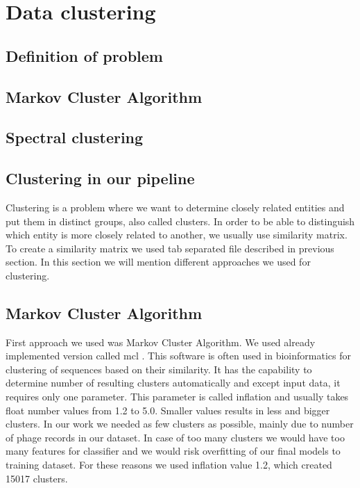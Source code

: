 
\section{Data clustering}
\subsection{Definition of problem}
\subsection{Markov Cluster Algorithm}
\subsection{Spectral clustering}
\subsection{Clustering in our pipeline}
Clustering is a problem where we want to determine closely related entities and put them in distinct groups, also called clusters.
In order to be able to distinguish which entity is more closely related to another, we usually use similarity matrix.
To create a similarity matrix we used tab separated file described in previous section.
In this section we will mention different approaches we used for clustering. 
\subsection{Markov Cluster Algorithm}
First approach we used was Markov Cluster Algorithm. 
We used already implemented version called mcl \cite{mcl}.
This software is often used in bioinformatics for clustering of sequences based on their similarity.
It has the capability to determine number of resulting clusters automatically and except input data, it requires only one parameter.
This parameter is called inflation and usually takes float number values from 1.2 to 5.0.
Smaller values results in less and bigger clusters.
In our work we needed as few clusters as possible, mainly due to number of phage records in our dataset.
In case of too many clusters we would have too many features for classifier and we would risk overfitting of our final models to training dataset.
For these reasons we used inflation value 1.2, which created 15017 clusters.

